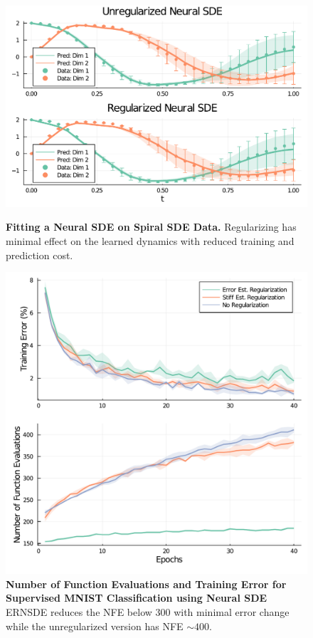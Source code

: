 \begin{figure}[t]
  \centering
  \begin{minipage}[c]{0.49\textwidth}
    \includegraphics[width=\linewidth]{../figures/global_regularization_neural_des/spiral_sde}
    \caption{\textbf{Fitting a Neural SDE on Spiral SDE Data.} Regularizing has minimal effect on the learned dynamics with reduced training and prediction cost.}
    \label{fig:fit_neural_sde_globalreg}
  \end{minipage}
  \hfill
  \begin{minipage}[c]{0.49\textwidth}
    \includegraphics[width=\linewidth]{../figures/global_regularization_neural_des/mnist_nsde_v2}
    \caption{\textbf{Number of Function Evaluations and Training Error for Supervised MNIST Classification using Neural SDE} ERNSDE reduces the NFE below 300 with minimal error change while the unregularized version has NFE $\sim 400$.}
    \label{fig:mnist_nsde_globalreg}
  \end{minipage}
\end{figure}

